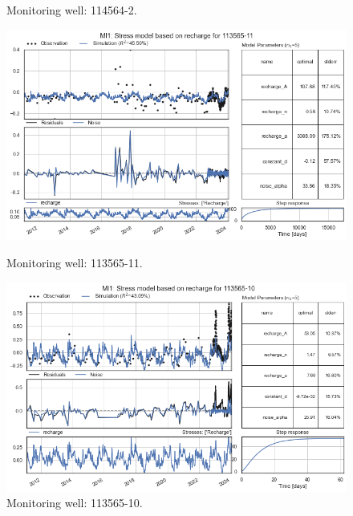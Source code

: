 \begin{figure}[htbp]
\begin{minipage}{0.32\textwidth}
        \caption{Monitoring well: 114564-2.}
        \label{fig:112565-3}
    \end{minipage}
\end{figure}
\begin{figure}[htbp]
    \centering
    \begin{minipage}{0.32\textwidth}
        \centering
        \includegraphics[width=\linewidth]{frontmatter/Rozenburg-fig/19.png}
        \caption{Monitoring well: 113565-11.}
        \label{fig:112565-3}
    \end{minipage}
    \hfill
    \begin{minipage}{0.32\textwidth}
        \centering
        \includegraphics[width=\linewidth]{frontmatter/Rozenburg-fig/20.png}
        \caption{Monitoring well: 113565-10.}
        \label{fig:112565-3}
    \end{minipage}
    \hfill
    \begin{minipage}{0.32\textwidth}
        \centering

\end{minipage}
\end{figure}

